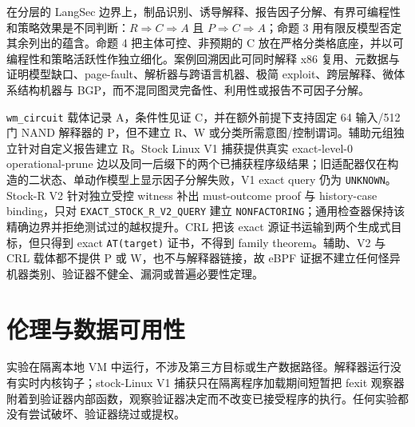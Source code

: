\documentclass[
  11pt,
  a4paper,
]{ctexart}
\begin{document}
在分层的 LangSec
边界上，制品识别、诱导解释、报告因子分解、有界可编程性和策略效果是不同判断：\(R\Rightarrow C\Rightarrow A\)
且 \(P\Rightarrow C\Rightarrow A\)；命题 3
用有限反模型否定其余列出的蕴含。命题 4 把主体可控、非预期的 C
放在严格分类格底座，并以可编程性和策略活跃性作独立细化。案例回溯因此可同时解释
x86 复用、元数据与证明模型缺口、page-fault、解析器与跨语言机器、极简
exploit、跨层解释、微体系结构机器与
BGP，而不混同图灵完备性、利用性或报告不可因子分解。

\texttt{wm\_circuit} 载体记录 A，条件性见证 C，并在额外前提下支持固定 64
输入/512 门 NAND 解释器的 P，但不建立 R、W
或分类所需意图/控制谓词。辅助元组独立针对自定义报告建立 R。Stock Linux
V1 捕获提供真实 exact-level-0 operational-prune
边以及同一后缀下的两个已捕获程序级结果；旧适配器仅在构造的二状态、单动作模型上显示因子分解失败，V1
exact query 仍为 \texttt{UNKNOWN}。Stock-R V2 针对独立受控 witness 补出
must-outcome proof 与 history-case binding，只对
\texttt{EXACT\_STOCK\_R\_V2\_QUERY} 建立
\texttt{NONFACTORING}；通用检查器保持该精确边界并拒绝测试过的越权提升。CRL
把该 exact 源证书运输到两个生成式目标，但只得到 exact
\texttt{AT(target)} 证书，不得到 family theorem。辅助、V2 与 CRL
载体都不提供 P 或 W，也不与解释器链接，故 eBPF
证据不建立任何怪异机器类别、验证器不健全、漏洞或普遍必要性定理。

\hypertarget{ux4f26ux7406ux4e0eux6570ux636eux53efux7528ux6027}{%
\section{伦理与数据可用性}\label{ux4f26ux7406ux4e0eux6570ux636eux53efux7528ux6027}}

实验在隔离本地 VM
中运行，不涉及第三方目标或生产数据路径。解释器运行没有实时内核钩子；stock-Linux
V1 捕获只在隔离程序加载期间短暂把 fexit
观察器附着到验证器内部函数，观察验证器决定而不改变已接受程序的执行。任何实验都没有尝试破坏、验证器绕过或提权。
\end{document}
